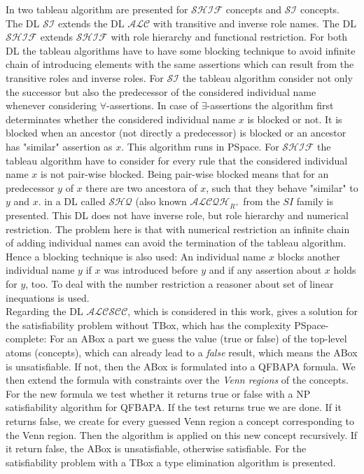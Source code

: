 \documentclass{book}
\theoremstyle{break}
\theoremstyle{definition}
\begin{document}
In \cite{2} two tableau algorithm are presented for $\mathcal{SHIF}$ concepts and $\mathcal{SI}$ concepts. The DL $\mathcal{SI}$ extends the DL $\mathcal{ALC}$ with transitive and inverse role names. The DL $\mathcal{SHIF}$ extends $\mathcal{SHIF}$ with role hierarchy and functional restriction. For both DL the tableau algorithms have to have some blocking technique to avoid infinite chain of introducing elements with the same assertions which can result from the transitive roles and inverse roles. For $\mathcal{SI}$ the tableau algorithm consider not only the successor but also the predecessor of the considered individual name whenever considering $\forall$-assertions. In case of $\exists$-assertions the algorithm first determinates whether the considered individual name $x$ is blocked or not. It is blocked when an ancestor (not directly a predecessor) is blocked or an ancestor has "similar" assertion as $x$. This algorithm runs in PSpace. For $\mathcal{SHIF}$ the tableau algorithm have to consider for every rule that the considered individual name $x$ is not pair-wise blocked. Being pair-wise blocked means that for an predecessor $y$ of $x$ there are two ancestora of $x$, such that they behave "similar" to $y$ and $x$. in \cite{alcqh} a DL called $\mathcal{SHQ}$ (also known $\mathcal{ALCQH}_{R^+}$ from the $SI$ family is presented. This DL does not have inverse role, but role hierarchy and numerical restriction. The problem here is that with numerical restriction an infinite chain of adding individual names can avoid the termination of the tableau algorithm. Hence a blocking technique is also used: An individual name $x$ blocks another individual name $y$ if $x$ was introduced before $y$ and if any assertion about $x$ holds for $y$, too. To deal with the number restriction a reasoner about set of linear inequations is used.\\
Regarding the DL $\mathcal{ALCSCC}$, which is considered in this work, \cite{4} gives a solution for the satisfiability problem without TBox, which has the complexity PSpace-complete: For an ABox a part we guess the value (true or false) of the top-level atoms (concepts), which can already lead to a \textit{false} result, which means the ABox is unsatisfiable. If not, then the ABox is formulated into a QFBAPA formula. We then extend the formula with constraints over the \textit{Venn regions} of the concepts. For the new formula we test whether it returns true or false with a NP satisfiability algorithm for QFBAPA. If the test returns true we are done. If it returns false, we create for every guessed Venn region a concept corresponding to the Venn region. Then the algorithm is applied on this new concept recursively. If it return false, the ABox is unsatisfiable, otherwise satisfiable. For the satisfiability problem with a TBox a type elimination algorithm is presented.
\end{document}
